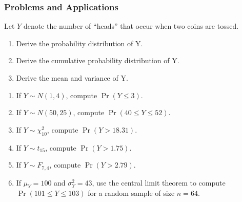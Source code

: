 

\begin{frame}
\frametitle{Problems and Applications}
Let $Y$ denote the number of ``heads'' that occur when two coins are tossed.
\begin{enumerate}
\item Derive the probability distribution of Y.
\item Derive the cumulative probability distribution of Y.
\item Derive the mean and variance of Y.
\end{enumerate}
\pause
{}
\begin{enumerate}
\item If $Y \sim N(1,4)$, compute $\Pr(Y \leq 3)$.
\item If $Y \sim N(50,25)$, compute $\Pr(40 \leq Y \leq 52)$.
\item If $Y \sim \chi^2_{10}$, compute $\Pr(Y > 18.31)$.
\item If $Y \sim t_{15}$, compute $\Pr(Y > 1.75)$.
\item If $Y \sim F_{7,4}$, compute $\Pr(Y > 2.79)$.
\item If $\mu_Y=100$ and $\sigma_Y^2=43$, use the central limit theorem to compute $\Pr(101 \leq Y \leq 103)$ for a random sample of size $n=64$.
\end{enumerate}
\end{frame}
